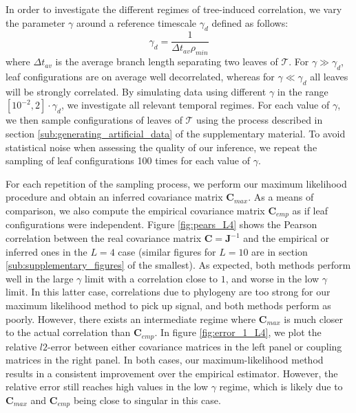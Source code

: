 \documentclass[preprint,amsmath,amssymb,superscriptaddress,showpacs,pre]{revtex4-1}
\begin{document}
In order to investigate the different regimes of tree-induced correlation, we vary the parameter $\gamma$ around a reference timescale $\gamma_d$ defined as follows: 
\begin{equation}
    \gamma_d = \frac{1}{\Delta t_{av}\rho_{min}} 
\end{equation}
where $\Delta t_{av}$ is the average branch length separating two leaves of $\mathcal{T}$. 
For $\gamma \gg \gamma_d$, leaf configurations are on average well decorrelated, whereas for $\gamma \ll \gamma_d$ all leaves will be strongly correlated. 
By simulating data using different $\gamma$ in the range $[10^{-2},2]\cdot\gamma_d$, we investigate all relevant temporal regimes.  
For each value of $\gamma$, we then sample  configurations of leaves of $\mathcal{T}$ using the process described in section \ref{sub:generating_artificial_data} of the supplementary material. 
To avoid statistical noise when assessing the quality of our inference, we repeat the sampling of leaf configurations 100 times for each value of $\gamma$.

For each repetition of the sampling process, we perform our maximum likelihood procedure and obtain an inferred covariance matrix $\bm{C}_{max}$. 
As a means of comparison, we also compute the empirical covariance matrix $\bm{C}_{emp}$ as if leaf configurations were independent. 
Figure \ref{fig:pears_L4} shows the Pearson correlation between the real covariance matrix $\bm{C}=\bm{J}^{-1}$ and the empirical or inferred ones in the $L=4$ case (similar figures for $L=10$ are in section \ref{sub:supplementary_figures} of the smallest). 
As expected, both methods perform well in the large $\gamma$ limit with a correlation close to $1$, and worse in the low $\gamma$ limit. 
In this latter case, correlations due to phylogeny are too strong for our maximum likelihood method to pick up signal, and both methods perform as poorly. 
However, there exists an intermediate regime where $\bm{C}_{max}$ is much closer to the actual correlation than  $\bm{C}_{emp}$. 
In figure \ref{fig:error_1_L4}, we plot the relative $l2$-error between either covariance matrices in the left panel or coupling matrices in the right panel. 
In both cases, our maximum-likelihood method results in a consistent improvement over the empirical estimator. 
However, the relative error still reaches high values in the low $\gamma$ regime, which is likely due to $\bm{C}_{max}$ and $\bm{C}_{emp}$ being close to singular in this case. 
\end{document}
